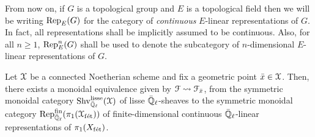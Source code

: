             \begin{convention} \label{conv: continuous_linear_representations}
                From now on, if $G$ is a topological group and $E$ is a topological field then we will be writing $\mathrm{Rep}_E(G)$ for the category of \textit{continuous} $E$-linear representations of $G$. In fact, all representations shall be implicitly assumed to be continuous. Also, for all $n \geq 1$, $\mathrm{Rep}_E^n(G)$ shall be used to denote the subcategory of $n$-dimensional $E$-linear representations of $G$.
            \end{convention}
            \begin{theorem} \label{theorem: galois_representations_are_lisse_sheaves}
                \cite[Theorem 1.4.5.7]{conrad_etale_cohomology} Let $\mathcal{X}$ be a connected Noetherian scheme and fix a geometric point $\bar{x} \in \mathcal{X}$. Then, there exists a monoidal equivalence given by $\mathcal{F} \leadsto \mathcal{F}_{\bar{x}}$, from the symmetric monoidal category $\mathrm{Shv}_{\bar{\mathbb{Q}}_{\ell}}^{\mathrm{lisse}}(\mathcal{X})$ of lisse $\bar{\mathbb{Q}}_{\ell}$-sheaves to the symmetric monoidal category $\mathrm{Rep}_{\bar{\mathbb{Q}}_{\ell}}^{\mathrm{fin}}(\pi_1(\mathcal{X}_{\mathrm{f\acute{e}t}}))$ of finite-dimensional continuous $\bar{\mathbb{Q}}_{\ell}$-linear representations of $\pi_1(X_{\mathrm{f\acute{e}t}})$.
            \end{theorem}